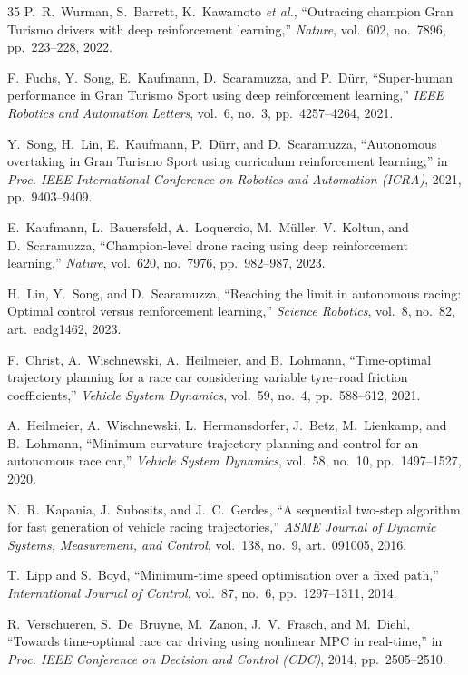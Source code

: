 \documentclass{iopjournal}
\begin{document}
\begin{thebibliography}{35}
P.~R.~Wurman, S.~Barrett, K.~Kawamoto \emph{et al.},
``Outracing champion Gran Turismo drivers with deep reinforcement learning,''
\emph{Nature}, vol.~602, no.~7896, pp.~223--228, 2022.

F.~Fuchs, Y.~Song, E.~Kaufmann, D.~Scaramuzza, and P.~D\"urr,
``Super-human performance in Gran Turismo Sport using deep reinforcement
learning,'' \emph{IEEE Robotics and Automation Letters}, vol.~6, no.~3,
pp.~4257--4264, 2021.

Y.~Song, H.~Lin, E.~Kaufmann, P.~D\"urr, and D.~Scaramuzza,
``Autonomous overtaking in Gran Turismo Sport using curriculum reinforcement
learning,'' in \emph{Proc. IEEE International Conference on Robotics and
Automation (ICRA)}, 2021, pp.~9403--9409.

E.~Kaufmann, L.~Bauersfeld, A.~Loquercio, M.~M\"uller, V.~Koltun, and
D.~Scaramuzza,
``Champion-level drone racing using deep reinforcement learning,''
\emph{Nature}, vol.~620, no.~7976, pp.~982--987, 2023.

H.~Lin, Y.~Song, and D.~Scaramuzza,
``Reaching the limit in autonomous racing: Optimal control versus
reinforcement learning,'' \emph{Science Robotics}, vol.~8, no.~82,
art.~eadg1462, 2023.

F.~Christ, A.~Wischnewski, A.~Heilmeier, and B.~Lohmann,
``Time-optimal trajectory planning for a race car considering variable
tyre--road friction coefficients,'' \emph{Vehicle System Dynamics}, vol.~59,
no.~4, pp.~588--612, 2021.

A.~Heilmeier, A.~Wischnewski, L.~Hermansdorfer, J.~Betz, M.~Lienkamp, and
B.~Lohmann,
``Minimum curvature trajectory planning and control for an autonomous race
car,'' \emph{Vehicle System Dynamics}, vol.~58, no.~10, pp.~1497--1527, 2020.

N.~R.~Kapania, J.~Subosits, and J.~C.~Gerdes,
``A sequential two-step algorithm for fast generation of vehicle racing
trajectories,'' \emph{ASME Journal of Dynamic Systems, Measurement, and
Control}, vol.~138, no.~9, art.~091005, 2016.

T.~Lipp and S.~Boyd,
``Minimum-time speed optimisation over a fixed path,'' \emph{International
Journal of Control}, vol.~87, no.~6, pp.~1297--1311, 2014.

R.~Verschueren, S.~De~Bruyne, M.~Zanon, J.~V.~Frasch, and M.~Diehl,
``Towards time-optimal race car driving using nonlinear MPC in real-time,''
in \emph{Proc. IEEE Conference on Decision and Control (CDC)}, 2014,
pp.~2505--2510.


\end{thebibliography}
\end{document}
